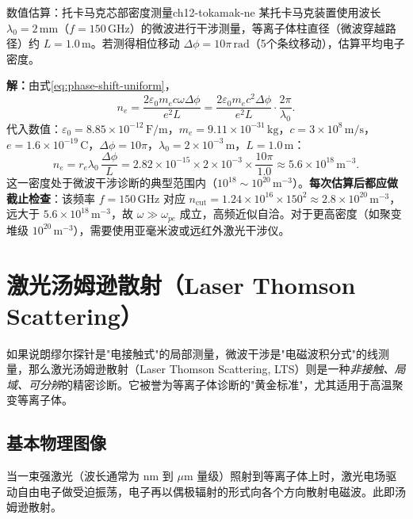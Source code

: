 \documentclass[12pt,a4paper,openany,oneside]{book}
\newcommand{\eps}{\varepsilon}
\newcommand{\difficulty}[1]{\marginnote{\hfill\textcolor{coverMid!80}{\rule[-0.1em]{2pt}{0.9em}}\,\textcolor{coverMid}{\footnotesize\textbf{[#1]}}}}
\begin{document}
\begin{example}{数值估算：托卡马克芯部密度测量}{ch12-tokamak-ne}
\difficulty{基础}
某托卡马克装置使用波长 $\lambda_0 = 2\,\mathrm{mm}$（$f = 150\,\mathrm{GHz}$）的微波进行干涉测量，等离子体柱直径（微波穿越路径）约 $L = 1.0\,\mathrm{m}$。若测得相位移动 $\Delta\phi = 10\pi\,\mathrm{rad}$（5个条纹移动），估算平均电子密度。

\textbf{解：}由式\eqref{eq:phase-shift-uniform}，
\begin{equation}
n_e = \frac{2\eps_0 m_e c \omega \Delta\phi}{e^2 L}
= \frac{2\eps_0 m_e c^2 \Delta\phi}{e^2 L} \cdot \frac{2\pi}{\lambda_0}.
\end{equation}
代入数值：$\eps_0 = 8.85\times 10^{-12}\,\mathrm{F/m}$，$m_e = 9.11\times 10^{-31}\,\mathrm{kg}$，$c = 3\times 10^8\,\mathrm{m/s}$，$e = 1.6\times 10^{-19}\,\mathrm{C}$，$\Delta\phi = 10\pi$，$\lambda_0 = 2\times 10^{-3}\,\mathrm{m}$，$L = 1.0\,\mathrm{m}$：
\begin{equation}
n_e = r_e\lambda_0\,\frac{\Delta\phi}{L}
= 2.82\times 10^{-15}\times 2\times 10^{-3}\times\frac{10\pi}{1.0}
\approx 5.6\times 10^{18}\,\mathrm{m}^{-3}.
\end{equation}
这一密度处于微波干涉诊断的典型范围内（$10^{18}\sim 10^{20}\,\mathrm{m}^{-3}$）。\textbf{每次估算后都应做截止检查}：该频率 $f=150\,\mathrm{GHz}$ 对应 $n_{\mathrm{cut}} = 1.24\times 10^{16}\times 150^2 \approx 2.8\times 10^{20}\,\mathrm{m}^{-3}$，远大于 $5.6\times 10^{18}\,\mathrm{m}^{-3}$，故 $\omega\gg\omega_{pe}$ 成立，高频近似自洽。对于更高密度（如聚变堆级 $10^{20}\,\mathrm{m}^{-3}$），需要使用亚毫米波或远红外激光干涉仪。
\end{example}


\section{激光汤姆逊散射（Laser Thomson Scattering）}
\label{sec:12.4}

如果说朗缪尔探针是"电接触式"的局部测量，微波干涉是"电磁波积分式"的线测量，那么激光汤姆逊散射（Laser Thomson Scattering, LTS）则是一种\emph{非接触、局域、可分辨}的精密诊断。它被誉为等离子体诊断的"黄金标准"，尤其适用于高温聚变等离子体。

\subsection{基本物理图像}

当一束强激光（波长通常为 $\mathrm{nm}$ 到 $\mu\mathrm{m}$ 量级）照射到等离子体上时，激光电场驱动自由电子做受迫振荡，电子再以偶极辐射的形式向各个方向散射电磁波。此即汤姆逊散射。
\end{document}
